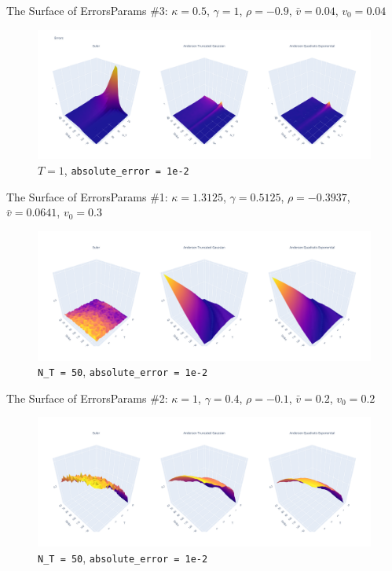 \begin{frame}{The Surface of Errors}{Params \#3: $\kappa = 0.5$, $\gamma = 1$, $\rho = -0.9$, $\bar v = 0.04$, $v_0 = 0.04$}
    \begin{figure}
        \includegraphics[width=\textwidth]{part4/pictures/err_surface_strike_N_T.pdf}
        \caption{$T=1$, \texttt{absolute\_error = 1e-2}}
    \end{figure}
\end{frame}

\begin{frame}{The Surface of Errors}{Params \#1: $\kappa = 1.3125$, $\gamma = 0.5125$, $\rho = -0.3937$, $\bar v = 0.0641$, $v_0 = 0.3$}
    \begin{figure}
        \includegraphics[width=\textwidth]{part4/pictures/err_surface_strike_T_N_T=50_param1.pdf}
        \caption{\texttt{N\_T = 50}, \texttt{absolute\_error = 1e-2}}
    \end{figure}
\end{frame}

\begin{frame}{The Surface of Errors}{Params \#2: $\kappa = 1$, $\gamma = 0.4$, $\rho = -0.1$, $\bar v = 0.2$, $v_0 = 0.2$}
    \begin{figure}
        \includegraphics[width=\textwidth]{part4/pictures/err_surface_strike_T_N_T=50_param2.pdf}
        \caption{\texttt{N\_T = 50}, \texttt{absolute\_error = 1e-2}}
    \end{figure}
\end{frame}


